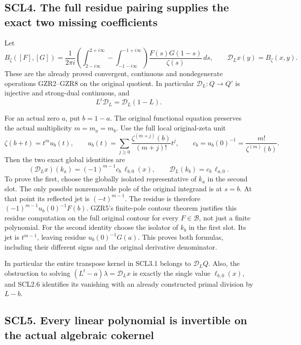 \subsection{SCL4. The full residue pairing supplies the exact two
missing
coefficients}\label{scl4.-the-full-residue-pairing-supplies-the-exact-two-missing-coefficients}

Let \[
 B_\zeta([F],[G])=\frac1{2\pi i}
 \left(\int_{2-i\infty}^{2+i\infty}
       -\int_{-1-i\infty}^{-1+i\infty}\right)
 \frac{F(s)G(1-s)}{\zeta(s)}\,ds,
\qquad
 \mathcal D_Lx(y)=B_\zeta(x,y).
 \tag{SCL4.1}
\] These are the already proved convergent, continuous and nondegenerate
operations GZR2--GZR8 on the original quotient. In particular
\(\mathcal D_L:Q\to Q'\) is injective and strong-dual continuous, and \[
 L^t\mathcal D_L=\mathcal D_L(1-L).
 \tag{SCL4.2}
\]

For an actual zero \(a\), put \(b=1-a\). The original functional
equation preserves the actual multiplicity \(m=m_a=m_b\). Use the full
local original-zeta unit \[
 \zeta(b+t)=t^m u_b(t),\qquad
 u_b(t)=\sum_{j\ge0}\frac{\zeta^{(m+j)}(b)}{(m+j)!}t^j,\qquad
 c_b=u_b(0)^{-1}=\frac{m!}{\zeta^{(m)}(b)}.
 \tag{SCL4.3}
\] Then the two exact global identities are \[
 \boxed{
 (\mathcal D_Lx)(k_a)
   =(-1)^{m-1}c_b\,\ell_{b,0}(x),\qquad
 \mathcal D_L(k_b)=c_b\,\ell_{a,0}.}
 \tag{SCL4.4}
\] To prove the first, choose the globally isolated representative of
\(k_a\) in the second slot. The only possible nonremovable pole of the
original integrand is at \(s=b\). At that point its reflected jet is
\((-t)^{m-1}\). The residue is therefore \((-1)^{m-1}u_b(0)^{-1}F(b)\).
GZR5's finite-pole contour theorem justifies this residue computation on
the full original contour for every \(F\in\mathcal B\), not just a
finite polynomial. For the second identity choose the isolator of
\(k_b\) in the first slot. Its jet is \(t^{m-1}\), leaving residue
\(u_b(0)^{-1}G(a)\). This proves both formulas, including their
different signs and the original derivative denominator.

In particular the entire transpose kernel in SCL3.1 belongs to
\(\mathcal D_LQ\). Also, the obstruction to solving
\((L^t-a)\lambda=\mathcal D_Lx\) is exactly the single value
\(\ell_{b,0}(x)\), and SCL2.6 identifies its vanishing with an already
constructed primal division by \(L-b\).

\subsection{SCL5. Every linear polynomial is invertible on the actual
algebraic
cokernel}\label{scl5.-every-linear-polynomial-is-invertible-on-the-actual-algebraic-cokernel}

